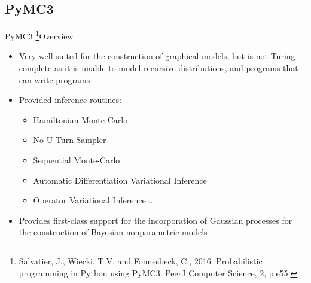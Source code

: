 \documentclass[AERbeamer%
              ,optEnglish%
              ,optBiber%
              ,optBibstyleAlphabetic%
              ,optBeamerClassicFormat%
              ]{AERlatex}%
\begin{document}
\subsection{PyMC3}
\begin{frame}[c]{PyMC3 \footnote{Salvatier, J., Wiecki, T.V. and Fonnesbeck, C., 2016. Probabilistic programming
                                 in Python using PyMC3. PeerJ Computer Science, 2, p.e55.}}{Overview}
    \centering
    \begin{itemize}
        \item Very well-suited for the construction of graphical models, but is not Turing-complete as it is unable to model
              recursive distributions, and programs that can write programs
        \item Provided inference routines:
        \begin{itemize}
            \item Hamiltonian Monte-Carlo
            \item No-U-Turn Sampler
            \item Sequential Monte-Carlo
            \item Automatic Differentiation Variational Inference
            \item Operator Variational Inference...
        \end{itemize}
        \item Provides first-class support for the incorporation of Gaussian processes for the construction of Bayesian nonparametric models
    \end{itemize}
\end{frame}
\end{document}
